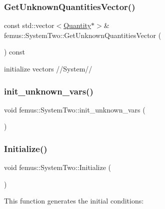 \subsubsection{\texorpdfstring{Get\+Unknown\+Quantities\+Vector()}{GetUnknownQuantitiesVector()}}
{\footnotesize\ttfamily const std\+::vector$<$\mbox{\hyperlink{classfemus_1_1_quantity}{Quantity}}$\ast$$>$\& femus\+::\+System\+Two\+::\+Get\+Unknown\+Quantities\+Vector (\begin{DoxyParamCaption}{ }\end{DoxyParamCaption}) const\hspace{0.3cm}{\ttfamily [inline]}}



initialize vectors //\+System// 

\mbox{\label{classfemus_1_1_system_two_a99f560fca648af0fd7897f9f05bf353b}} 
\subsubsection{\texorpdfstring{init\+\_\+unknown\+\_\+vars()}{init\_unknown\_vars()}}
{\footnotesize\ttfamily void femus\+::\+System\+Two\+::init\+\_\+unknown\+\_\+vars (\begin{DoxyParamCaption}{ }\end{DoxyParamCaption})}

\mbox{\label{classfemus_1_1_system_two_ab0256de1760f7ec1eeabc79983bae956}} 
\subsubsection{\texorpdfstring{Initialize()}{Initialize()}}
{\footnotesize\ttfamily void femus\+::\+System\+Two\+::\+Initialize (\begin{DoxyParamCaption}{ }\end{DoxyParamCaption})}



This function generates the initial conditions\+: 

\mbox{\label{classfemus_1_1_system_two_a7147efa42fdf4fa7f820a05e8e69a0ef}} 
